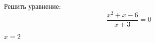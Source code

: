 \begin{ex}
	Решить уравнение:
	$$ \dfrac{x^2+x-6}{x+3}=0 $$
	\begin{answer}
		$x=2$
	\end{answer}
\end{ex}